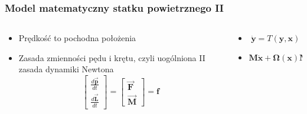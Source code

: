 \documentclass[aspectratio=169]{beamer}
\begin{document}
\begin{frame}
\begin{columns}[T]
\begin{column}{0.33\textwidth}
\begin{figure}
{\begin{center}
\[	      		  \]
	      		   \end{center}}
	    		\end{figure}
		\end{column}
		\begin{column}{0.33\textwidth}
	    		\begin{figure}
	    		\end{figure}
		\end{column}
	\end{columns}	
\end{frame}

\begin{frame}%
	\frametitle{Model matematyczny statku powietrznego II}
	\begin{columns}[T]
		\begin{column}{0.5\textwidth}
			 \begin{itemize}
			  \item<2-> {
			    Prędkość to pochodna położenia
			    \vspace{15pt}
			  }
			  \item<4-> {   
			    Zasada zmienności pędu i krętu, czyli uogólniona II zasada dynamiki Newtona
			    \[
		              \begin{bmatrix}\frac{d\bm{\vec{p}}}{dt}\\ \frac{d\bm{\vec{L}}}{dt} \end{bmatrix} = \begin{bmatrix}\bm{\vec{F}}\\ \bm{\vec{M}} \end{bmatrix} = \bm{f}
		              \]
			    }
			\end{itemize}
		\end{column}
		\begin{column}{0.5\textwidth}
	   	 	\begin{itemize}
			  \item<3->[] {
			   \[
			   	\bm{\dot{y}} = T(\bm{y}, \bm{x})
			   \]
			  }
			  \vspace{15pt}
			  
			  \item<5->[]{   
			    \[
			   	\bm{M} \bm{\dot{x}} +  \bm{\Omega} \left( \bm{x} \right) \bm{M} \bm{x} = \bm{f}
			   \]
			    }
			\end{itemize}
		\end{column}
	\end{columns}
\end{frame}
\end{document}
